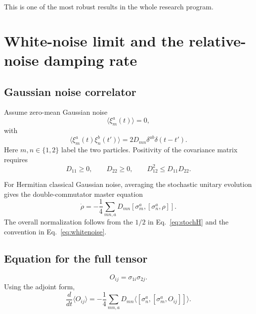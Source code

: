 \documentclass[11pt]{article}
\begin{document}
This is one of the most robust results in the whole research program.

\section{White-noise limit and the relative-noise damping rate}

\subsection{Gaussian noise correlator}

Assume zero-mean Gaussian noise
\begin{equation}
\langle\xi_m^a(t)\rangle=0,
\end{equation}
with
\begin{equation}
\langle\xi_m^a(t)\xi_n^b(t')\rangle
=2D_{mn}\delta^{ab}\delta(t-t').
\label{eq:whitenoise}
\end{equation}
Here $m,n\in\{1,2\}$ label the two particles. Positivity of the covariance matrix requires
\begin{equation}
D_{11}\ge0,
\qquad
D_{22}\ge0,
\qquad
D_{12}^2\le D_{11}D_{22}.
\label{eq:Dpositive}
\end{equation}

For Hermitian classical Gaussian noise, averaging the stochastic unitary evolution gives the double-commutator master equation
\begin{equation}
\boxed{
\dot\rho
=-\frac14\sum_{mn,a}D_{mn}
[\sigma_m^a,[\sigma_n^a,\rho]].
}
\label{eq:doublecomm}
\end{equation}
The overall normalization follows from the $1/2$ in Eq.~\eqref{eq:stochH} and the convention in Eq.~\eqref{eq:whitenoise}.

\subsection{Equation for the full tensor}
\begin{equation}
O_{ij}=\sigma_{1i}\sigma_{2j}.
\end{equation}
Using the adjoint form,
\begin{equation}
\frac{d}{dt}\langle O_{ij}\rangle
=-\frac14\sum_{mn,a}D_{mn}
\langle[\sigma_n^a,[\sigma_m^a,O_{ij}]]\rangle.
\end{equation}
\end{document}
